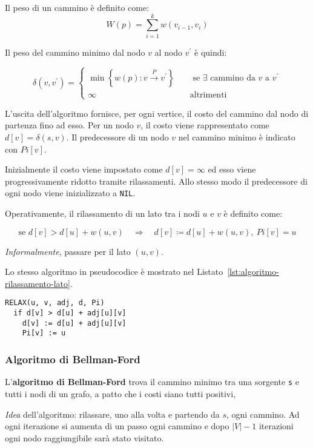 \documentclass[italian, 10pt]{article}
\begin{document}
\bigskip
Il peso di un cammino è definito come:
\[ W(p) = \displaystyle \sum_{i=1}^{k} w (v_{i-1}, v_i) \]

Il peso del cammino minimo dal nodo \(v\) al nodo \(v^\prime\) è quindi:

\[ \delta(v, v^\prime) = \begin{cases}
    \min\left\{w(p): v \xrightarrow{P}v^\prime\right\} \quad & \text{ se } \exists \text{ cammino da } v \text{ a } v^\prime \\[10pt]
    \infty                                                   & \text{altrimenti}
  \end{cases}\]

L'uscita dell'algoritmo fornisce, per ogni vertice, il costo del cammino dal nodo di partenza fino ad esso.
Per un nodo \(v\), il costo viene rappresentato come \(d[v] = \delta(s, v)\).
Il predecessore di un nodo \(v\) nel cammino minimo è indicato con \(Pi[v]\).

Inizialmente il costo viene impostato come \(d[v] = \infty\) ed esso viene progressivamente ridotto tramite rilassamenti.
Allo stesso modo il predecessore di ogni nodo viene inizializzato a \texttt{NIL}.

Operativamente, il rilassamento di un lato tra i nodi \(u\) e \(v\) è definito come:

\[\text{se } d[v] > d[u] + w(u, v) \quad \Rightarrow \quad d[v] \coloneqq d[u] + w(u, v), \ Pi[v] = u \]

\textit{Informalmente},  passare per il lato \((u, v)\).

\bigskip
Lo stesso algoritmo in pseudocodice è mostrato nel Listato~\ref{lst:algoritmo-rilassamento-lato}.

\begin{lstlisting}[style=pseudocode, caption={Algoritmo per il rilassamento di un lato}, label={lst:algoritmo-rilassamento-lato}]
RELAX(u, v, adj, d, Pi)
  if d[v] > d[u] + adj[u][v]
    d[v] := d[u] + adj[u][v]
    Pi[v] := u
\end{lstlisting}

\subsubsection{Algoritmo di Bellman-Ford}

L'\textbf{algoritmo di Bellman-Ford} trova il cammino minimo tra una sorgente \texttt{s} e tutti i nodi di un grafo, a patto che i costi siano tutti positivi,

\textit{Idea} dell'algoritmo:
rilassare, uno alla volta e partendo da \(s\), ogni cammino.
Ad ogni iterazione si aumenta di un passo ogni cammino e dopo \(|V|-1\) iterazioni ogni nodo raggiungibile sarà stato visitato.
\end{document}
